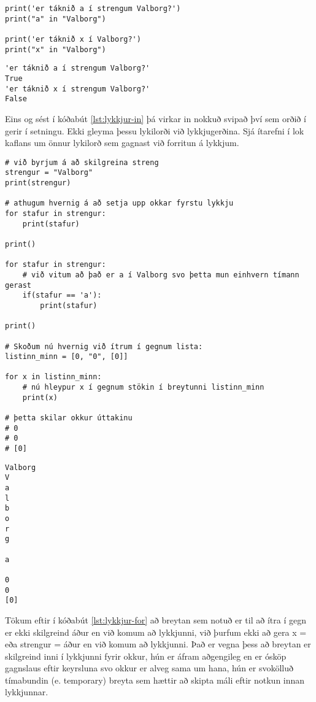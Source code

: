 \begin{lstlisting}[caption=Lykilorðið in, label=lst:lykkjur-in]
print('er táknið a í strengum Valborg?')
print("a" in "Valborg")

print('er táknið x í Valborg?')
print("x" in "Valborg")
\end{lstlisting}
\lstset{style=uttak}
\begin{lstlisting}
'er táknið a í strengum Valborg?'
True
'er táknið x í strengum Valborg?'
False
\end{lstlisting}
\lstset{style=venjulegt}

Eins og sést í kóðabút \ref{lst:lykkjur-in} þá virkar in nokkuð svipað því sem orðið í gerir í setningu.
Ekki gleyma þessu lykilorði við lykkjugerðina.
Sjá ítarefni í lok kaflans um önnur lykilorð sem gagnast við forritun á lykkjum.

\begin{lstlisting}[caption=For lykkjur, label=lst:lykkjur-for]
# við byrjum á að skilgreina streng
strengur = "Valborg"
print(strengur)

# athugum hvernig á að setja upp okkar fyrstu lykkju
for stafur in strengur:
	print(stafur)

print()

for stafur in strengur:
	# við vitum að það er a í Valborg svo þetta mun einhvern tímann gerast
	if(stafur == 'a'):
		print(stafur)
		
print()

# Skoðum nú hvernig við ítrum í gegnum lista:
listinn_minn = [0, "0", [0]]

for x in listinn_minn:
	# nú hleypur x í gegnum stökin í breytunni listinn_minn
	print(x)
	
# þetta skilar okkur úttakinu
# 0
# 0
# [0]
\end{lstlisting}
\lstset{style=uttak}
\begin{lstlisting}
Valborg
V
a
l
b
o
r
g
	
a
	
0
0
[0]
\end{lstlisting}

\lstset{style=venjulegt}

Tökum eftir í kóðabút \ref{lst:lykkjur-for} að breytan sem notuð er til að ítra í gegn er ekki skilgreind áður en við komum að lykkjunni, við þurfum ekki að gera x =  eða strengur = áður en við komum að lykkjunni.
Það er vegna þess að breytan er skilgreind inni í lykkjunni fyrir okkur, hún er áfram aðgengileg en er ósköp gagnslaus eftir keyrsluna svo okkur er alveg sama um hana, hún er svokölluð tímabundin (e. temporary) breyta sem hættir að skipta máli eftir notkun innan lykkjunnar.

